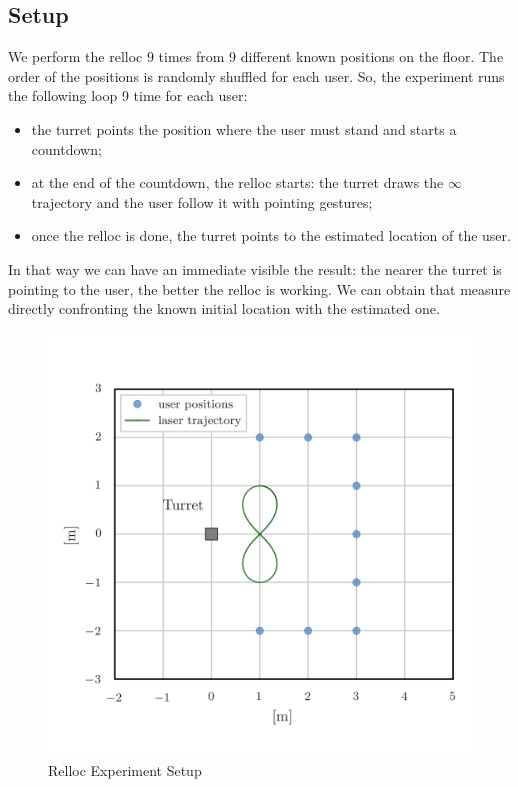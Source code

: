 \subsection{Setup}
We perform the relloc 9 times from 9 different known positions on the floor. The order of the positions is randomly shuffled for each user. So, the experiment runs the following loop 9 time for each user:
\begin{itemize}
    \item the turret points the position where the user must stand and starts a countdown;
    \item at the end of the countdown, the relloc starts: the turret draws the $\infty$ trajectory and the user follow it with pointing gestures;
    \item once the relloc is done, the turret points to the estimated location of the user.
\end{itemize}
In that way we can have an immediate visible the result: the nearer the turret is pointing to the user, the better the relloc is working. We can obtain that measure directly confronting the known initial location with the estimated one.
\begin{figure}
	\centering
	\includegraphics[width=\textwidth]{img/rellocExpSetup.png}%
	\caption{Relloc Experiment Setup}
	\label{fig:pointingExpSetup}
\end{figure}

